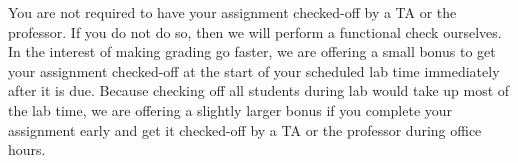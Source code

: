 You are not required to have your assignment checked-off by a TA or the
professor. If you do not do so, then we will perform a functional check
ourselves. In the interest of making grading go faster, we are offering a small
bonus to get your assignment checked-off at the start of your scheduled lab
time immediately after it is due. Because checking off all students during lab
would take up most of the lab time, we are offering a slightly larger bonus if
you complete your assignment early and get it checked-off by a TA or the
professor during office hours.

%
